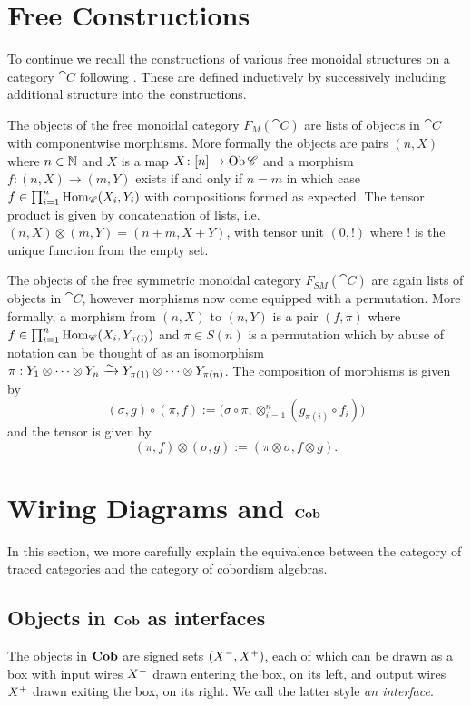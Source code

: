 \documentclass[12pt,oneside,article,draft]{memoir}
\begin{document}
\section{Free Constructions}

To continue we recall the constructions of various free monoidal structures on a category $\cat{C}$ following \cite{abramsky}.  These are defined inductively by successively including additional structure into the constructions.

The objects of the free monoidal category $F_M(\cat{C})$ are lists of objects in $\cat{C}$ with componentwise morphisms.  More formally the objects are pairs $(n,X)$ where $n\in\mathbb{N}$ and $X$ is a map $X\colon[n]\to \operatorname{Ob}\mathscr{C}$ and a morphism $f:(n,X)\to(m,Y)$ exists if and only if $n=m$ in which case $f\in\prod_{i=1}^n\operatorname{Hom}_{\mathscr{C}}(X_i,Y_i)$ with compositions formed as expected.  The tensor product is given by concatenation of lists, i.e. $(n,X)\otimes(m,Y)=(n+m,X+Y)$, with tensor unit $(0,!)$ where $!$ is the unique function from the empty set.

The objects of the free symmetric monoidal category $F_{SM}(\cat{C})$ are again lists of objects in $\cat{C}$, however morphisms now come equipped with a permutation.  More formally, a morphism from $(n,X)$ to $(n,Y)$ is a pair $(f,\pi)$ where $f\in\prod_{i=1}^n\operatorname{Hom}_{\mathscr{C}}(X_i,Y_{\pi(i)})$ and $\pi\in S(n)$ is a permutation which by abuse of notation can be thought of as an isomorphism $\pi:Y_1\otimes\cdots\otimes Y_n\xrightarrow{\sim} Y_{\pi(1)}\otimes\cdots\otimes Y_{\pi(n)}$.  The composition of morphisms is given by 
$$(\sigma,g)\circ(\pi,f):=\Big(\sigma\circ\pi,\otimes_{i=1}^n (g_{\pi(i)}\circ f_i)\Big)$$ 
and the tensor is given by 
$$(\pi,f)\otimes(\sigma,g):=(\pi\otimes\sigma,f\otimes g).$$  

\section{Wiring Diagrams and $\mathbf{Cob}$}\label{sec:wds and cob}

In this section, we more carefully explain the equivalence between the category of traced categories and the category of cobordism algebras.

\subsection{Objects in $\mathbf{Cob}$ as interfaces}

The objects in $\mathbf{Cob}$ are signed sets $(X^-,X^+)$, each of which can be drawn as a box with input wires $X^-$ drawn entering the box, on its left, and output wires $X^+$ drawn exiting the box, on its right. We call the latter style \emph{an interface}.
\end{document}

